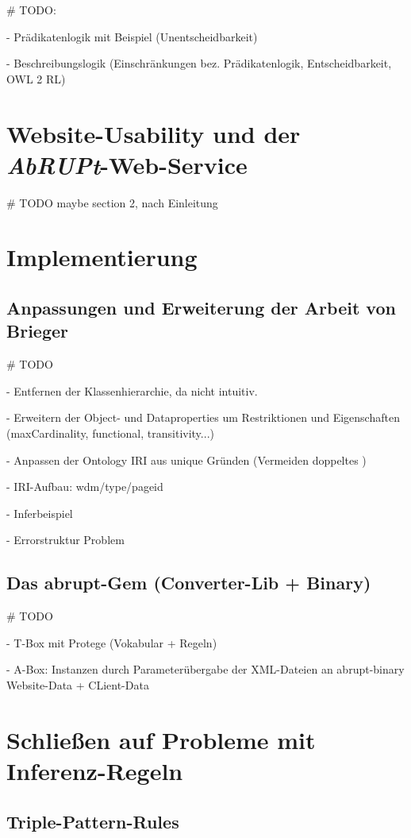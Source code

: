 \documentclass[runningheads,a4paper]{llncs}
\begin{document}
\# TODO:

- Prädikatenlogik mit Beispiel (Unentscheidbarkeit)

- Beschreibungslogik (Einschränkungen bez. Prädikatenlogik, Entscheidbarkeit, OWL 2 RL)

\newpage

\section{Website-Usability und der \textit{AbRUPt}-Web-Service}

\# TODO maybe section 2, nach Einleitung
\section{Implementierung}

\subsection{Anpassungen und Erweiterung der Arbeit von Brieger}
\# TODO

- Entfernen der Klassenhierarchie, da nicht intuitiv.

- Erweitern der Object- und Dataproperties um Restriktionen und Eigenschaften (maxCardinality, functional, transitivity...)

- Anpassen der Ontology IRI aus unique Gründen (Vermeiden doppeltes )

- IRI-Aufbau: {wdm}/{type}/{page}{id}

- Inferbeispiel

- Errorstruktur
Problem
\subsection{Das abrupt-Gem (Converter-Lib + Binary)}
\# TODO

- T-Box mit Protege (Vokabular + Regeln)

- A-Box: Instanzen durch Parameterübergabe der XML-Dateien an abrupt-binary Website-Data + CLient-Data

\newpage

\section{Schließen auf Probleme mit Inferenz-Regeln}
\subsection{Triple-Pattern-Rules}
\end{document}
